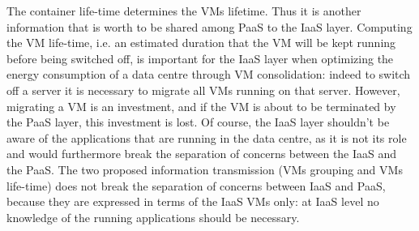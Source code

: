 The container life-time determines the VMs lifetime. Thus it is another information that is worth to be shared among PaaS to the IaaS layer.
Computing the VM life-time, i.e. an estimated duration that the VM will be kept running before being switched off, is important for the IaaS layer when optimizing the energy consumption of a data centre through VM consolidation: indeed to switch off a server it is necessary to migrate all VMs running on that server.
However, migrating a VM is an investment, and if the VM is about to be terminated by the PaaS layer, this investment is lost.
Of course, the IaaS layer shouldn't be aware of the applications that are running in the data centre, as it is not its role and would furthermore break the separation of concerns between the IaaS and the PaaS.
The two proposed information transmission (VMs grouping and VMs life-time) does not break the separation of concerns between IaaS and PaaS, because they are expressed in terms of the IaaS VMs only: at IaaS level no knowledge of the running applications should be necessary.

%
